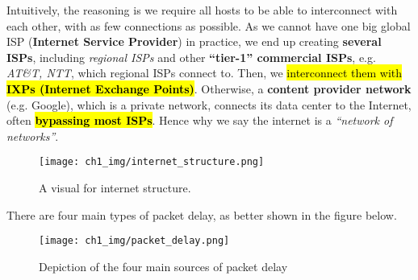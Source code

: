 \documentclass[12pt,a4paper]{article}
\begin{document}

\vspace{0.5em}

\noindent Intuitively, the reasoning is we require all hosts to be able to interconnect with each other, with as few connections as possible. As we cannot have one big global ISP (\textbf{Internet Service Provider}) in practice, we end up creating \textbf{several ISPs}, including \emph{regional ISPs} and other \textbf{``tier-1'' commercial ISPs}, e.g. \emph{AT\&T, NTT}, which regional ISPs connect to. Then, we \hl{interconnect them with \textbf{IXPs (Internet Exchange Points)}}. Otherwise, a \textbf{content provider network} (e.g. Google), which is a private network, connects its data center to the Internet, often \hl{\textbf{bypassing most ISPs}}. Hence why we say the internet is a \emph{``network of networks''}.

\begin{figure}[h]
    \centering
    \texttt{[image: ch1\_img/internet\_structure.png]}
    \caption{A visual for internet structure.}
    \label{fig:internet_structure}
\end{figure}

\vspace{1.0em}
\noindent There are four main types of packet delay, as better shown in the figure below.
\begin{figure}[h]
    \centering
    \texttt{[image: ch1\_img/packet\_delay.png]}
    \caption{Depiction of the four main sources of packet delay}
    \label{fig:packet_delay}
\end{figure}
\end{document}
